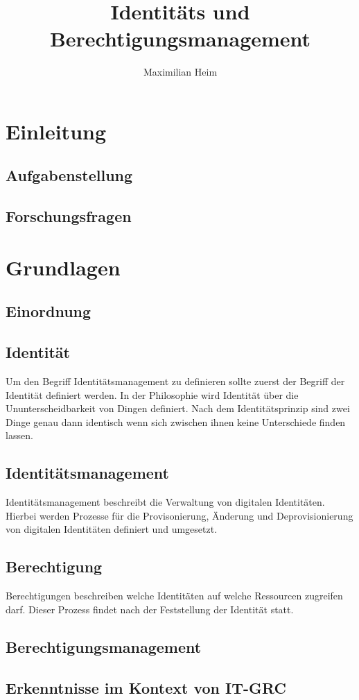 \documentclass[10pt]{article}
\author{Maximilian Heim}
\title{Identitäts und Berechtigungsmanagement}
\begin{document}
\maketitle
\newpage
\tableofcontents
\newpage
\section{Einleitung}
\subsection{Aufgabenstellung}
\subsection{Forschungsfragen}
\section{Grundlagen}
\subsection{Einordnung}
\subsection{Identität}
Um den Begriff Identitätsmanagement zu definieren sollte zuerst der Begriff der Identität definiert werden. In der Philosophie wird Identität über die Ununterscheidbarkeit von Dingen definiert. Nach dem Identitätsprinzip sind zwei Dinge genau dann identisch wenn sich zwischen ihnen keine Unterschiede finden lassen.
\subsection{Identitätsmanagement}
Identitätsmanagement beschreibt die Verwaltung von digitalen Identitäten. Hierbei werden Prozesse für die Provisonierung, Änderung und Deprovisionierung von digitalen Identitäten definiert und umgesetzt.~\cite{sharma2016identity}
\subsection{Berechtigung}
Berechtigungen beschreiben welche Identitäten auf welche Ressourcen zugreifen darf. Dieser Prozess findet nach der Feststellung der Identität statt.
\subsection{Berechtigungsmanagement}
\subsection{Erkenntnisse im Kontext von IT-GRC}
\end{document}
